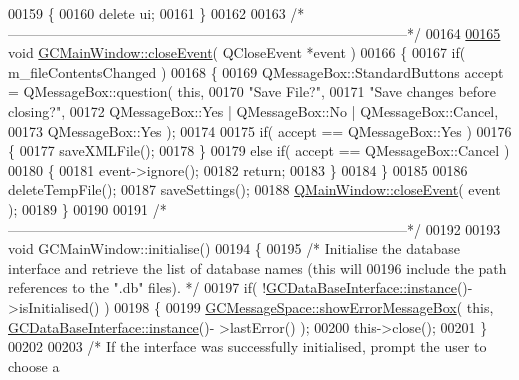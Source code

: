 \begin{DoxyCode}
00159 \{
00160   \textcolor{keyword}{delete} ui;
00161 \}
00162 
00163 \textcolor{comment}{/*
      --------------------------------------------------------------------------------------*/}
00164 
\hypertarget{gcmainwindow_8cpp_source_l00165}{}\hyperlink{class_g_c_main_window_a08995f775bad0ea2ff98965ede9c2967}{00165} \textcolor{keywordtype}{void} \hyperlink{class_g_c_main_window_a08995f775bad0ea2ff98965ede9c2967}{GCMainWindow::closeEvent}( QCloseEvent *event )
00166 \{
00167   \textcolor{keywordflow}{if}( m\_fileContentsChanged )
00168   \{
00169     QMessageBox::StandardButtons accept = QMessageBox::question( \textcolor{keyword}{this},
00170                                                                  \textcolor{stringliteral}{"Save File?"},
00171                                                                  \textcolor{stringliteral}{"Save changes
       before closing?"},
00172                                                                  
      QMessageBox::Yes | QMessageBox::No | QMessageBox::Cancel,
00173                                                                  
      QMessageBox::Yes );
00174 
00175     \textcolor{keywordflow}{if}( accept == QMessageBox::Yes )
00176     \{
00177       saveXMLFile();
00178     \}
00179     \textcolor{keywordflow}{else} \textcolor{keywordflow}{if}( accept == QMessageBox::Cancel )
00180     \{
00181       \textcolor{keyword}{event}->ignore();
00182       \textcolor{keywordflow}{return};
00183     \}
00184   \}
00185 
00186   deleteTempFile();
00187   saveSettings();
00188   \hyperlink{class_g_c_main_window_a08995f775bad0ea2ff98965ede9c2967}{QMainWindow::closeEvent}( event );
00189 \}
00190 
00191 \textcolor{comment}{/*
      --------------------------------------------------------------------------------------*/}
00192 
00193 \textcolor{keywordtype}{void} GCMainWindow::initialise()
00194 \{
00195   \textcolor{comment}{/* Initialise the database interface and retrieve the list of database names
       (this will}
00196 \textcolor{comment}{    include the path references to the ".db" files). */}
00197   \textcolor{keywordflow}{if}( !\hyperlink{class_g_c_data_base_interface_a1baea9c0667aa8b610ec30076fcab84c}{GCDataBaseInterface::instance}()->isInitialised() )
00198   \{
00199     \hyperlink{namespace_g_c_message_space_ab118b3a133686167617eb955029fd44e}{GCMessageSpace::showErrorMessageBox}( \textcolor{keyword}{this}, \hyperlink{class_g_c_data_base_interface_a1baea9c0667aa8b610ec30076fcab84c}{GCDataBaseInterface::instance}()-
      >lastError() );
00200     this->close();
00201   \}
00202 
00203   \textcolor{comment}{/* If the interface was successfully initialised, prompt the user to choose a
}
\end{DoxyCode}
